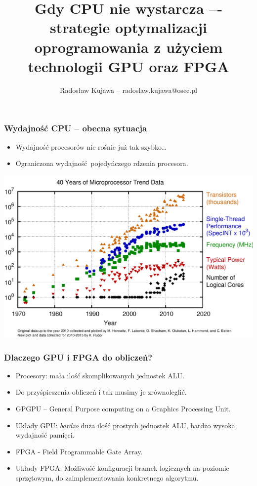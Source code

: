 \documentclass[dvipsnames,table]{beamer}
\title{Gdy CPU nie wystarcza –- strategie optymalizacji oprogramowania z użyciem technologii GPU oraz FPGA}
\author{Radosław Kujawa -- radoslaw.kujawa@osec.pl}
\institute{OSEC}
\begin{document}
\begin{frame}
	\titlepage
\end{frame}

\begin{frame}
\frametitle{Wydajność CPU -- obecna sytuacja}
\begin{itemize}
	\item Wydajność procesorów nie rośnie już tak szybko\dots
	\item Ograniczona wydajność pojedyńczego rdzenia procesora.
\end{itemize}
\begin{center}
\includegraphics[scale=0.25]{img-40years.png}
\end{center}
\end{frame}

\begin{frame}
	\frametitle{Dlaczego GPU i FPGA do obliczeń?}
\begin{itemize}
	\item Procesory: mała ilość skomplikowanych jednostek ALU.
	\item Do przyśpieszenia obliczeń i tak musimy je zrównoleglić.
	\item GPGPU -- General Purpose computing on a Graphics Processing Unit. 
	\item Układy GPU: {\em bardzo} duża ilość prostych jednostek ALU, bardzo wysoka wydajność pamięci.
	\item FPGA - Field Programmable Gate Array.
	\item Układy FPGA: Możliwość konfiguracji bramek logicznych na poziomie sprzętowym, do zaimplementowania konkretnego algorytmu.
	
\end{itemize}
\end{frame}
\end{document}
